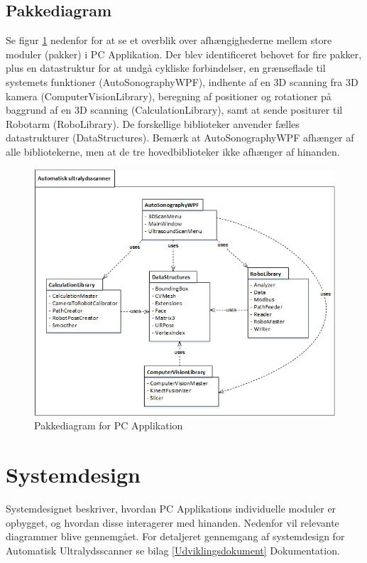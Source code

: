 \subsection{Pakkediagram}
 Se figur \ref{pakke} nedenfor for at se et overblik over afhængighederne mellem store moduler (pakker) i PC Applikation. Der blev identificeret behovet for fire pakker, plus en datastruktur for at undgå cykliske forbindelser, en grænseflade til systemets funktioner (AutoSonographyWPF), indhente af en 3D scanning fra 3D kamera (ComputerVisionLibrary), beregning af positioner og rotationer på baggrund af en 3D scanning (CalculationLibrary), samt at sende positurer til Robotarm (RoboLibrary). De forskellige biblioteker anvender fælles datastrukturer (DataStructures). Bemærk at AutoSonographyWPF afhænger af alle bibliotekerne, men at de tre hovedbiblioteker ikke afhænger af hinanden.

\begin{figure}[H]
    \centering
    \includegraphics[width=1\textwidth]{figurer/d/Design/Pakkediagram}
    \caption{Pakkediagram for PC Applikation}
    \label{pakke}
\end{figure}

\newpage
\section{Systemdesign} \label{Systemdesign}
Systemdesignet beskriver, hvordan PC Applikations individuelle moduler er opbygget, og hvordan disse interagerer med hinanden.  
Nedenfor vil relevante diagrammer blive gennemgået. For detaljeret gennemgang af systemdesign for Automatisk Ultralydsscanner se bilag \ref{Udviklingsdokument} Dokumentation.

